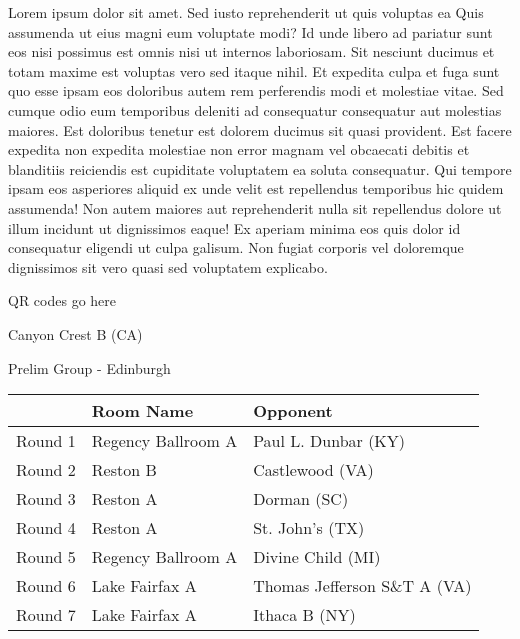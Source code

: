 \documentclass{article}%
\begin{document}
\vspace*{8pt}%
\linebreak%
\newline%
\newline%
Lorem ipsum dolor sit amet. Sed iusto reprehenderit ut quis voluptas ea Quis assumenda ut eius magni eum voluptate modi? Id unde libero ad pariatur sunt eos nisi possimus est omnis nisi ut internos laboriosam. Sit nesciunt ducimus et totam maxime est voluptas vero sed itaque nihil. Et expedita culpa et fuga sunt quo esse ipsam eos doloribus autem rem perferendis modi et molestiae vitae.\newline%
\newline%
Sed cumque odio eum temporibus deleniti ad consequatur consequatur aut molestias maiores. Est doloribus tenetur est dolorem ducimus sit quasi provident. Est facere expedita non expedita molestiae non error magnam vel obcaecati debitis et blanditiis reiciendis est cupiditate voluptatem ea soluta consequatur. Qui tempore ipsam eos asperiores aliquid ex unde velit est repellendus temporibus hic quidem assumenda!\newline%
\newline%
Non autem maiores aut reprehenderit nulla sit repellendus dolore ut illum incidunt ut dignissimos eaque! Ex aperiam minima eos quis dolor id consequatur eligendi ut culpa galisum. Non fugiat corporis vel doloremque dignissimos sit vero quasi sed voluptatem explicabo.\newline%
\newline%
%
\vspace*{30pt}%
\begin{center}%
\begin{Huge}%
QR codes go here%
\end{Huge}%
\end{center}%
\newpage%
%
\begin{center}%
\begin{Huge}%
Canyon Crest B (CA)%
\end{Huge}%
\vspace*{8pt}%
\linebreak%
\begin{Large}%
Prelim Group {-} Edinburgh%
\end{Large}%
\end{center}%
\begin{tabularx}{\textwidth}{|c|Y|Y|}%
\hline%
&Room Name&Opponent\\%
\hline%
Round 1&Regency Ballroom A&Paul L. Dunbar (KY)\\%
Round 2&Reston B&Castlewood (VA)\\%
Round 3&Reston A&Dorman (SC)\\%
Round 4&Reston A&St. John's (TX)\\%
Round 5&Regency Ballroom A&Divine Child (MI)\\%
Round 6&Lake Fairfax A&Thomas Jefferson S\&T A (VA)\\%
Round 7&Lake Fairfax A&Ithaca B (NY)\\%
\hline%
\end{tabularx}%
\end{document}
